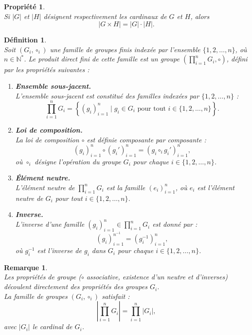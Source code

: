 \documentclass[a4paper, 14pt]{report}
\newtheorem{definition}{Définition}[section]
\newtheorem{remark}{Remarque}[section]
\newtheorem{propriety}{Propriété}[section]
\begin{document}
\begin{onehalfspace}
{			
			\begin{propriety} \cite{schaub1997} \\
				Si \( |G| \) et \( |H| \) désignent respectivement les cardinaux de \( G \) et \( H \), alors \[
				|G \times H| = |G| \cdot |H|.
				\]
			\end{propriety}
			
			
			\begin{definition} \cite{schaub1997}\\
				Soit \( (G_i, \circ_i) \) une famille de groupes finis indexée par l'ensemble \( \{1, 2, \dots, n\} \), où \( n \in \mathbb{N}^{*} \). Le \textit{produit direct fini} de cette famille est un groupe \( \left( \prod_{i=1}^{n} G_i, \circ \right) \), défini par les propriétés suivantes : 
				\begin{enumerate}[label=\roman*)]
					\item \textbf{Ensemble sous-jacent.} \\
					L'ensemble sous-jacent est constitué des familles indexées par \( \{1, 2, \dots, n\} \) :  
					\[
					\prod_{i=1}^{n} G_i = \left\{ (g_i)_{i=1}^{n} \mid g_i \in G_i \text{ pour tout } i \in \{1, 2, \dots, n\} \right\}.
					\]
					\item \textbf{Loi de composition.} \\
					La loi de composition \( \circ \) est définie composante par composante :  
					\[
					(g_i)_{i=1}^{n} \circ (g_i')_{i=1}^{n} = (g_i \circ_i g_i')_{i=1}^{n},
					\]  
					où \( \circ_i \) désigne l'opération du groupe \( G_i \) pour chaque \( i \in \{1, 2, \dots, n\} \).
					\item \textbf{Élément neutre.} \\
					L'élément neutre de \( \prod_{i=1}^{n} G_i \) est la famille \( (e_i)_{i=1}^{n} \), où \( e_i \) est l'élément neutre de \( G_i \) pour tout \( i \in \{1, 2, \dots, n\} \).
					\item \textbf{Inverse.} \\
					L'inverse d'une famille \( (g_i)_{i=1}^{n} \in \prod_{i=1}^{n} G_i \) est donné par :  
					\[
					(g_i)_{i=1}^{{n}^{-1}} = (g_i^{-1})_{i=1}^{n},
					\]  
					où \( g_i^{-1} \) est l'inverse de \( g_i \) dans \( G_i \) pour chaque \( i \in \{1, 2, \dots, n\} \).\\
				\end{enumerate}
			\end{definition}
			
			\begin{remark} \cite{schaub1997} \\
				Les propriétés de groupe (\( \circ \) associative, existence d’un neutre et d’inverses) découlent directement des propriétés des groupes \( G_i \).\\
				La famille de groupes \( (G_i, \circ_i) \) satisfait :
				\[
				\left| \prod_{i=1}^{n} G_i \right| = \prod_{i=1}^{n} |G_i|,
				\]
				avec \( |G_i| \) le cardinal de \( G_i \).\\
			\end{remark}
			
}
\end{onehalfspace}
\end{document}
